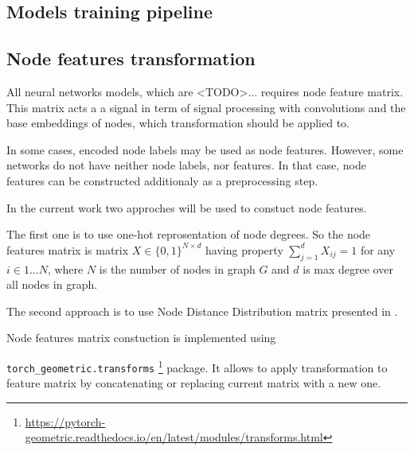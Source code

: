 \subsection{Models training pipeline}




\subsection{Node features transformation}



All neural networks models, which are  <TODO>... requires node feature matrix. This matrix
acts a a signal in term of signal processing with convolutions and the base embeddings of nodes,
which transformation should be applied to.

In some cases, encoded node labels may be used as node features. However, some networks
do not have neither node labels, nor features.
In that case, node features can be constructed additionaly as a preprocessing step.

In the current work two approches will be used to constuct node features.

The first one is to use one-hot reprosentation of node degrees. So the node features matrix
is matrix $X \in \{0,1\}^{N \times d}$ having property $\sum_{j=1}^{d}X_{ij} = 1$ for any $i \in 1 \dots N$,
where $N$ is the number of nodes in graph $G$ and $d$ is max degree over all nodes in graph.


The second approach is to use Node Distance Distribution matrix presented in \cite{Netpro2vec}.





Node features matrix constuction is implemented using

\texttt{torch\_geometric.transforms} \footnote{\url{https://pytorch-geometric.readthedocs.io/en/latest/modules/transforms.html}}
package. It allows to apply transformation to feature matrix by concatenating or replacing current matrix with a new one.

